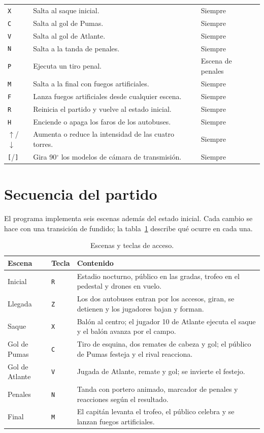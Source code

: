 \documentclass[12pt,letterpaper]{article}
\begin{document}
\begin{longtable}{p{}p{}p{}}
\texttt{X} & Salta al saque inicial. & Siempre\\
\texttt{C} & Salta al gol de Pumas. & Siempre\\
\texttt{V} & Salta al gol de Atlante. & Siempre\\
\texttt{N} & Salta a la tanda de penales. & Siempre\\
\texttt{P} & Ejecuta un tiro penal. & Escena de penales\\
\texttt{M} & Salta a la final con fuegos artificiales. & Siempre\\
\texttt{F} & Lanza fuegos artificiales desde cualquier escena. & Siempre\\
\texttt{R} & Reinicia el partido y vuelve al estado inicial. & Siempre\\
\texttt{H} & Enciende o apaga los faros de los autobuses. & Siempre\\
$\uparrow$/$\downarrow$ & Aumenta o reduce la intensidad de las cuatro torres. & Siempre\\
\texttt{[}/\texttt{]} & Gira 90$^\circ$ los modelos de cámara de transmisión. & Siempre\\
\end{longtable}

\section{Secuencia del partido}
El programa implementa seis escenas además del estado inicial. Cada cambio se hace con una
transición de fundido; la tabla~\ref{tab:escenas} describe qué ocurre en cada una.

\begin{table}[H]
\centering
\small
\begin{tabular}{p{}p{}p{}}
\toprule
\textbf{Escena} & \textbf{Tecla} & \textbf{Contenido}\\
\midrule
Inicial & \texttt{R} & Estadio nocturno, público en las gradas, trofeo en el pedestal y drones en vuelo.\\
Llegada & \texttt{Z} & Los dos autobuses entran por los accesos, giran, se detienen y los jugadores bajan y forman.\\
Saque & \texttt{X} & Balón al centro; el jugador 10 de Atlante ejecuta el saque y el balón avanza por el campo.\\
Gol de Pumas & \texttt{C} & Tiro de esquina, dos remates de cabeza y gol; el público de Pumas festeja y el rival reacciona.\\
Gol de Atlante & \texttt{V} & Jugada de Atlante, remate y gol; se invierte el festejo.\\
Penales & \texttt{N} & Tanda con portero animado, marcador de penales y reacciones según el resultado.\\
Final & \texttt{M} & El capitán levanta el trofeo, el público celebra y se lanzan fuegos artificiales.\\
\bottomrule
\end{tabular}
\caption{Escenas y teclas de acceso.}\label{tab:escenas}
\end{table}
\end{document}
